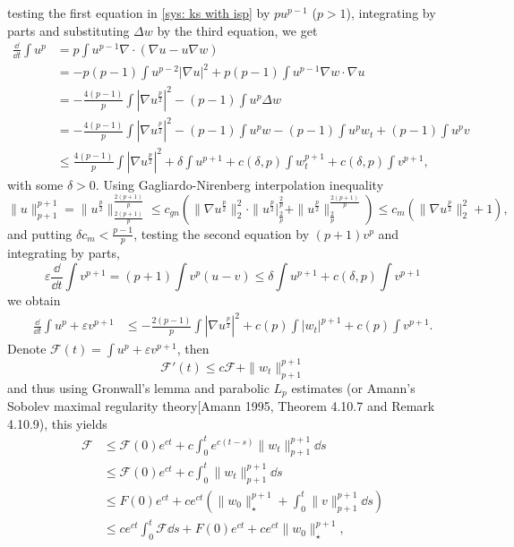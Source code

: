 testing the first equation in \eqref{sys: ks with isp} by $pu^{p-1}$ ($p>1$), integrating by parts and substituting $\Delta w$ by the third equation, we get
\begin{align*}
    \frac{\dd}{\dd t}\int u^p &= p\int u^{p-1}\nabla\cdot(\nabla u - u\nabla w)\\
    &= -p(p-1)\int u^{p-2}|\nabla u|^2 + p(p-1)\int u^{p-1}\nabla w\cdot \nabla u\\
    &= -\frac{4(p-1)}{p}\int |\nabla u^{\frac{p}2}|^2 - (p-1)\int u^p\Delta w\\
    &= -\frac{4(p-1)}{p}\int |\nabla u^{\frac{p}2}|^2
    - (p-1)\int u^pw - (p-1)\int u^pw_t + (p-1)\int u^pv\\
    &\leq \frac{4(p-1)}{p}\int |\nabla u^{\frac{p}2}|^2
     + \delta\int u^{p+1} + c(\delta,p)\int w_t^{p+1} + c(\delta,p)\int v^{p+1},
\end{align*}
with some $\delta>0$.
Using Gagliardo-Nirenberg interpolation inequality
\[
    \|u\|_{p+1}^{p+1} = \|u^{\frac{p}2}\|_{\frac{2(p+1)}{p}}^{\frac{2(p+1)}{p}}
    \leq c_{gn}(\|\nabla u^{\frac{p}{2}}\|^2_2\cdot\|u^{\frac{p}{2}}|_{\frac2p}^{\frac2p}
     + \|u^{\frac{p}{2}}\|_{\frac2p}^{\frac{2(p+1)}{p}})
     \leq c_m(\|\nabla u^{\frac{p}2}\|_2^2 + 1),
\]
and putting $\delta c_m < \frac{p-1}{p}$, testing the second equation by $(p+1)v^p$ and integrating by parts,
\begin{equation*}
  \varepsilon\frac{\dd}{\dd t}\int v^{p+1} = (p+1)\int v^p(u-v) \leq \delta\int u^{p+1} + c(\delta, p)\int v^{p+1}
\end{equation*}
we obtain 
\begin{align*}
  \frac{\dd}{\dd t}\int u^p + \varepsilon v^{p+1} &\leq 
  -\frac{2(p-1)}{p}\int |\nabla u^{\frac{p}2}|^2
  + c(p)\int |w_t|^{p+1} + c(p)\int v^{p+1}.
\end{align*}
Denote $\mathcal{F}(t) = \int u^p + \varepsilon v^{p+1}$, then 
\[
    \mathcal{F}'(t) \leq c\mathcal{F} + \|w_t\|_{p+1}^{p+1}
\]
and thus using Gronwall's lemma and parabolic $L_p$ estimates (or Amann's Sobolev maximal regularity theory[Amann 1995, Theorem 4.10.7 and Remark 4.10.9), this yields 
\begin{align*}
  \mathcal{F} &\leq \mathcal{F}(0)e^{ct} + c\int_0^te^{c(t-s)}\|w_t\|_{p+1}^{p+1}\dd s\\
  &\leq \mathcal{F}(0)e^{ct} + c\int_0^t\|w_t\|_{p+1}^{p+1}\dd s\\
  &\leq F(0)e^{ct} + ce^{ct}(\|w_0\|_\star^{p+1} + \int_0^t\|v\|_{p+1}^{p+1}\dd s)\\
  &\leq ce^{ct}\int_0^t\mathcal{F}\dd s + F(0)e^{ct} + ce^{ct}\|w_0\|_\star^{p+1},
\end{align*}
